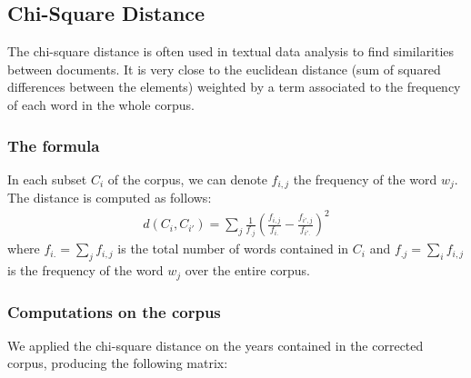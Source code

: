 \subsection{Chi-Square Distance}

The chi-square distance is often used in textual data analysis to find similarities between documents. It is very close to the euclidean distance (sum of squared differences between the elements) weighted by a term associated to the frequency of each word in the whole corpus.

\subsubsection{The formula}

In each subset $C_i$ of the corpus, we can denote $f_{i,j}$ the frequency of the word $w_j$. The distance is computed as follows:
\begin{eqnarray}
 d(C_i,C_{i'}) = \sum_j \frac{1}{f_{.j}} (\frac{f_{i,j}}{f_{i.}} - \frac{f_{i',j}}{f_{i'.}})^2
\end{eqnarray}
where $f_{i.} = \sum_j f_{i,j}$ is the total number of words contained in $C_i$ and $f_{.j} = \sum_i f_{i,j}$ is the frequency of the word $w_j$ over the entire corpus.

\subsubsection{Computations on the corpus}

We applied the chi-square distance on the years contained in the corrected corpus, producing the following matrix:


